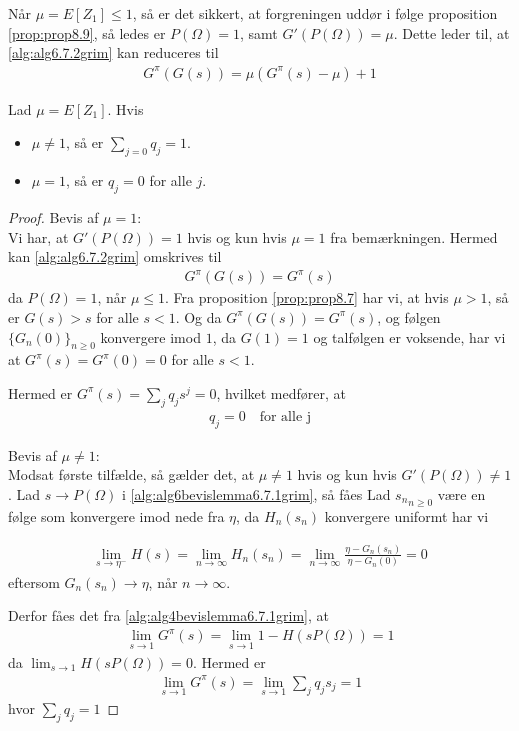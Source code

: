 \begin{rem}
Når $\mu=E[Z_1] \leq 1$, så er det sikkert, at forgreningen uddør i følge proposition \ref{prop:prop8.9}, så ledes er $P(\Omega)=1$, samt $G'(P(\Omega))=\mu$. Dette leder til, at \eqref{alg:alg6.7.2grim} kan reduceres til 
\begin{align*}
    G^\pi(G(s))=\mu (G^\pi(s)-\mu)+1
\end{align*}
\end{rem}
\begin{cor} \label{cor:cor6.7.7grim}
Lad $\mu=E[Z_1]$. Hvis 
\begin{itemize}
    \item $\mu \neq 1$, så er $\sum_{j=0}q_j=1$. 
    \item $\mu=1$, så er $q_j=0$ for alle $j$. 
\end{itemize}
\end{cor}
\begin{proof}
Bevis af $\mu=1$:\\
Vi har, at $G'(P(\Omega))=1$ hvis og kun hvis $\mu=1$ fra bemærkningen. Hermed kan \eqref{alg:alg6.7.2grim} omskrives til \begin{align*}
    G^\pi(G(s))=G^\pi(s)
\end{align*}
da $P(\Omega)=1$, når $\mu\leq1$. Fra proposition \ref{prop:prop8.7} har vi, at hvis $\mu > 1$, så er $G(s)>s$ for alle $s<1$. Og da $G^\pi(G(s)) =G^\pi(s)$, og følgen $\{G_n(0)\}_{n \geq 0}$ konvergere imod $1$, da $G(1) = 1$ og talfølgen er voksende, har vi at $G^\pi(s)=G^\pi(0)=0$ for alle $s<1$. 

Hermed er $G^\pi(s)=\sum_j q_j s^j =0$, hvilket medfører, at
\begin{align*}
    q_j=0 \quad \text{for alle j}
\end{align*}

Bevis af $\mu\neq1$:\\ 
Modsat første tilfælde, så gælder det, at $\mu\neq1$ hvis og kun hvis $G'(P(\Omega))\neq 1$. Lad $s\to P(\Omega)$ i \eqref{alg:alg6bevislemma6.7.1grim}, så fåes
Lad ${s_n}_{n \geq 0}$ være en følge som konvergere imod nede fra $\eta$, da $H_n(s_n)$ konvergere uniformt har vi

\begin{align*}
    \lim_{s\to \eta^-}H(s)= \lim_{n \to \infty} H_n(s_n) = \lim_{n \to \infty} \frac{\eta - G_n(s_n)}{\eta - G_n(0)} = 0
\end{align*}
eftersom $G_n(s_n) \to \eta$, når $n \to \infty$.

Derfor fåes det fra \eqref{alg:alg4bevislemma6.7.1grim}, at
\begin{align*}
    \lim_{s\to 1} G^\pi(s)=\lim_{s\to 1} 1-H(sP(\Omega))=1 
\end{align*}
da $\lim_{s\to 1} H(sP(\Omega))=0$. Hermed
er
\begin{align*}
    \lim_{s\to 1} G^\pi(s)=\lim_{s\to 1} \sum_j q_js_j =1
\end{align*}
hvor $\sum_j q_j=1$
\end{proof}

